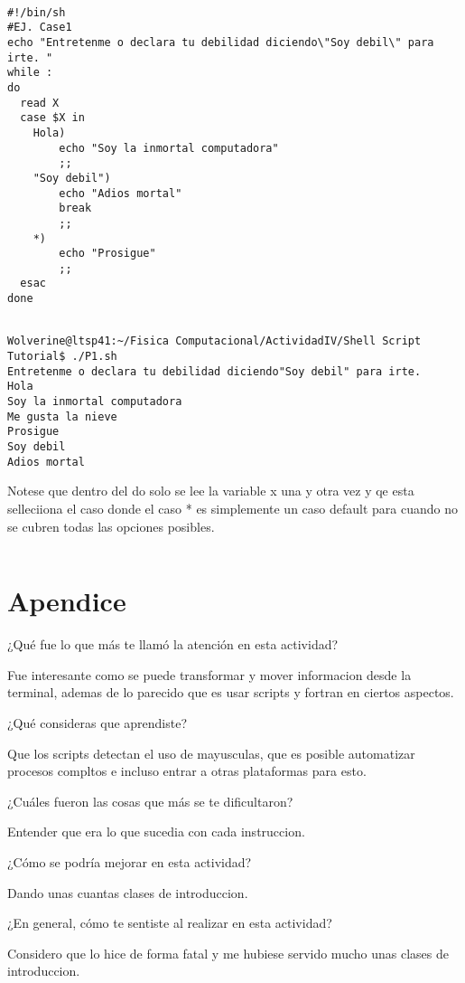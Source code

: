 \documentclass[a4paper]{article}
\begin{document}
\begin{verbatim}

#!/bin/sh
#EJ. Case1
echo "Entretenme o declara tu debilidad diciendo\"Soy debil\" para irte. "
while :
do
  read X
  case $X in
	Hola)
		echo "Soy la inmortal computadora"
		;;
	"Soy debil")
		echo "Adios mortal"
		break
		;;
	*)
		echo "Prosigue"
		;;
  esac
done

\end{verbatim}


\begin{verbatim}

Wolverine@ltsp41:~/Fisica Computacional/ActividadIV/Shell Script Tutorial$ ./P1.sh
Entretenme o declara tu debilidad diciendo"Soy debil" para irte. 
Hola
Soy la inmortal computadora
Me gusta la nieve
Prosigue
Soy debil
Adios mortal

\end{verbatim}

Notese que dentro del do solo se lee la variable x una y otra vez y qe esta selleciiona el caso donde el caso * es simplemente un caso default para cuando no se cubren todas las opciones posibles. 

\begin{verbatim}
\end{verbatim}

\section{Apendice}


¿Qué fue lo que más te llamó la atención en esta actividad?

Fue interesante como se puede transformar y mover informacion desde la terminal, ademas de lo parecido que es usar scripts y fortran en ciertos aspectos.

¿Qué consideras que aprendiste?
    
  
  
Que los scripts detectan el uso de mayusculas, que es posible automatizar procesos compltos e incluso entrar a otras plataformas para esto. 
    
   
¿Cuáles fueron las cosas que más se te dificultaron?
    
      
Entender que era lo que sucedia con cada instruccion. 
 
    
¿Cómo se podría mejorar en esta actividad?
    
    
Dando unas cuantas clases de introduccion.
   
    
¿En general, cómo te sentiste al realizar en esta actividad? 
    
     
    
    Considero que lo hice de forma fatal y me hubiese servido mucho unas clases de introduccion. 
    



\end{document}
